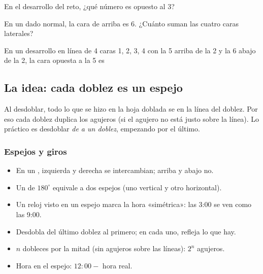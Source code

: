 \taller
{}
\begin{ejercicios}
\item En el desarrollo del reto, ¿qué número es opuesto al 3? 
\item En un dado normal, la cara de arriba es 6. ¿Cuánto suman las cuatro caras laterales? 
\end{ejercicios}
\begin{ejercicios}
\item En un desarrollo en línea de 4 caras 1, 2, 3, 4 con la 5 arriba de la 2 y la 6 abajo de la 2, la cara opuesta a la 5 es
\end{ejercicios}

\bitacora


\subsection{La idea: cada doblez es un espejo}
Al desdoblar, todo lo que se hizo en la hoja doblada se  en la línea del doblez. Por eso cada doblez duplica
los agujeros (si el agujero no está justo sobre la línea). Lo práctico es desdoblar \emph{de a un doblez}, empezando por el
último.

\subsubsection{Espejos y giros}
\begin{itemize}
  \item En un , izquierda y derecha se intercambian; arriba y abajo no.
  \item Un  de $180^\circ$ equivale a dos espejos (uno vertical y otro horizontal).
  \item Un reloj visto en un espejo marca la hora «simétrica»: las 3:00 se ven como las 9:00.
\end{itemize}


\begin{regla}
\begin{itemize}
  \item Desdobla del último doblez al primero; en cada uno, refleja lo que hay.
  \item $n$ dobleces por la mitad (sin agujeros sobre las líneas): $2^n$ agujeros.
  \item Hora en el espejo: $12{:}00 - $ hora real.
\end{itemize}
\end{regla}

